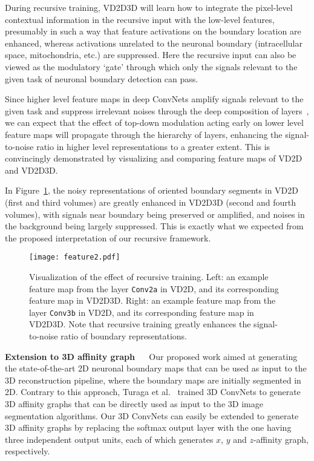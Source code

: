 \documentclass{article} %
\begin{document}
During recursive training, VD2D3D will learn how to integrate the pixel-level contextual information in the recursive input with the low-level features, presumably in such a way that feature activations on the boundary location are enhanced, whereas activations unrelated to the neuronal boundary (intracellular space, mitochondria, etc.) are suppressed. Here the recursive input can also be viewed as the modulatory `gate' through which only the signals relevant to the given task of neuronal boundary detection can pass.

Since higher level feature maps in deep ConvNets amplify signals relevant to the given task and suppress irrelevant noises through the deep composition of layers~\cite{LeCun2015}, we can expect that the effect of top-down modulation acting early on lower level feature maps will propagate through the hierarchy of layers, enhancing the signal-to-noise ratio in higher level representations to a greater extent. This is convincingly demonstrated by visualizing and comparing feature maps of VD2D and VD2D3D.

In Figure~\ref{feature},
the noisy representations of oriented boundary segments in VD2D (first and third volumes) are greatly enhanced in VD2D3D (second and fourth volumes), with signals near boundary being preserved or amplified, and noises in the background being largely suppressed. This is exactly what we expected from the proposed interpretation of our recursive framework.

\begin{figure}[!t]
\begin{center}
\texttt{[image: feature2.pdf]}
\end{center}
\caption{Visualization of the effect of recursive training. Left: an example feature map from the layer \texttt{Conv2a} in VD2D, and its corresponding feature map in VD2D3D. Right: an example feature map from the layer \texttt{Conv3b} in VD2D, and its corresponding feature map in VD2D3D. Note that recursive training greatly enhances the signal-to-noise ratio of boundary representations.}
\label{feature}
\end{figure}

{\bf Extension to 3D affinity graph}
$\quad$
Our proposed work aimed at generating the state-of-the-art 2D neuronal boundary maps that can be used as input to the 3D reconstruction pipeline, where the boundary maps are initially segmented in 2D. Contrary to this approach, Turaga et al.~\cite{Turaga2010} trained 3D ConvNets to generate 3D affinity graphs that can be directly used as input to the 3D image segmentation algorithms. Our 3D ConvNets can easily be extended to generate 3D affinity graphs by replacing the softmax output layer with the one having three independent output units, each of which generates $x$, $y$ and $z$-affinity graph, respectively.
\end{document}
